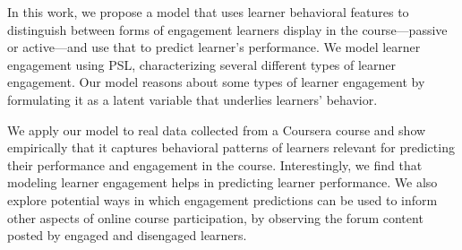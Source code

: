 In this work, we propose a model that uses learner behavioral features to distinguish between forms of engagement learners display in the course---passive or active---and use that to predict learner's performance. 
We model learner engagement using PSL, characterizing several different types of learner engagement. Our model reasons about some types of learner engagement by formulating it as a latent variable that underlies learners' behavior. 

We apply our model to real data collected from a Coursera course and show empirically that it captures behavioral patterns of learners relevant for 
predicting their performance and engagement in the course. Interestingly, we find that modeling learner engagement helps in predicting learner performance.
We also explore potential ways in which engagement predictions can be used to inform other aspects of online course participation, by observing the forum content
posted by  engaged and disengaged learners.

